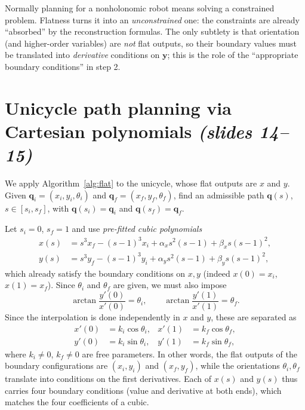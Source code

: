\documentclass[11pt,a4paper]{article}
\newcommand{\q}{\boldsymbol{q}}
\newcommand{\qi}{\boldsymbol{q}_i}
\newcommand{\qf}{\boldsymbol{q}_f}
\theoremstyle{definition}
\theoremstyle{plain}
\theoremstyle{remark}
\begin{document}
\begin{intuition}
Normally planning for a nonholonomic robot means solving a constrained problem. Flatness turns it into an
\emph{unconstrained} one: the constraints are already ``absorbed'' by the reconstruction formulas. The only subtlety is that
orientation (and higher-order variables) are \emph{not} flat outputs, so their boundary values must be translated into
\emph{derivative} conditions on $\boldsymbol y$; this is the role of the ``appropriate boundary conditions'' in step 2.
\end{intuition}

\section{Unicycle path planning via Cartesian polynomials \emph{(slides 14--15)}}
We apply Algorithm~\ref{alg:flat} to the unicycle, whose flat outputs are $x$ and $y$. Given $\qi=(x_i,y_i,\theta_i)$ and
$\qf=(x_f,y_f,\theta_f)$, find an admissible path $\q(s)$, $s\in[s_i,s_f]$, with $\q(s_i)=\qi$ and $\q(s_f)=\qf$.

Let $s_i=0$, $s_f=1$ and use \emph{pre-fitted cubic polynomials}
\begin{align}
x(s)&=s^3x_f-(s-1)^3x_i+\alpha_x s^2(s-1)+\beta_x s(s-1)^2,\\
y(s)&=s^3y_f-(s-1)^3y_i+\alpha_y s^2(s-1)+\beta_y s(s-1)^2,
\end{align}
which already satisfy the boundary conditions on $x,y$ (indeed $x(0)=x_i$, $x(1)=x_f$). Since $\theta_i$ and $\theta_f$ are
given, we must also impose
\begin{equation}
\arctan\frac{y'(0)}{x'(0)}=\theta_i,\qquad \arctan\frac{y'(1)}{x'(1)}=\theta_f .
\end{equation}
Since the interpolation is done independently in $x$ and $y$, these are separated as
\begin{equation}
\begin{aligned}
x'(0)&=k_i\cos\theta_i, & x'(1)&=k_f\cos\theta_f,\\
y'(0)&=k_i\sin\theta_i, & y'(1)&=k_f\sin\theta_f,
\end{aligned}
\end{equation}
where $k_i\ne0$, $k_f\ne0$ are free parameters.
In other words, the flat outputs of the boundary configurations are $(x_i,y_i)$ and $(x_f,y_f)$, while the orientations $\theta_i,\theta_f$ translate into conditions on the first derivatives. Each of $x(s)$ and $y(s)$ thus carries four boundary conditions (value and derivative at both ends), which matches the four coefficients of a cubic.
\end{document}
